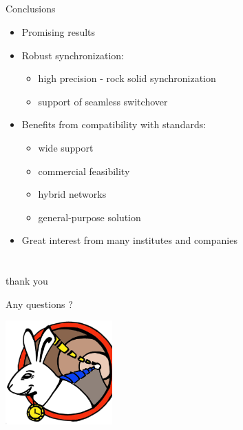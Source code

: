 \documentclass[compress,red]{beamer}
\begin{document}
\subsection{}
\begin{frame}{Conclusions}

    \begin{itemize}
	\item Promising results
	\item Robust synchronization:
	  \begin{itemize}
	    \item high precision - rock solid synchronization
	    \item support of seamless switchover 
	  \end{itemize}
	\item Benefits from compatibility with standards:
	  \begin{itemize}
	    \item wide support
	    \item commercial feasibility
	    \item hybrid networks
	    \item general-purpose solution
	  \end{itemize}
	\item Great interest from many institutes and companies	
      \end{itemize}


\end{frame}
\section{}
\begin{frame}{thank you}

    \begin{center}
    Any questions ?
    \end{center}

    
    \begin{center}
    \includegraphics[height=4.0cm]{logo/WRlogo.ps}
    \end{center}

\end{frame}
\end{document}
